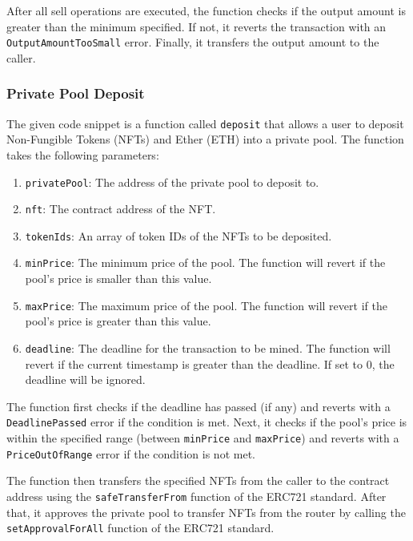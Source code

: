 After all sell operations are executed, the function checks if the
output amount is greater than the minimum specified. If not, it reverts
the transaction with an \texttt{OutputAmountTooSmall} error. Finally, it
transfers the output amount to the caller.

\hypertarget{private-pool-deposit}{%
\subsubsection{Private Pool Deposit}\label{private-pool-deposit}}

The given code snippet is a function called \texttt{deposit} that allows
a user to deposit Non-Fungible Tokens (NFTs) and Ether (ETH) into a
private pool. The function takes the following parameters:

\begin{enumerate}
\def\labelenumi{\arabic{enumi}.}
\tightlist
\item
  \texttt{privatePool}: The address of the private pool to deposit to.
\item
  \texttt{nft}: The contract address of the NFT.
\item
  \texttt{tokenIds}: An array of token IDs of the NFTs to be deposited.
\item
  \texttt{minPrice}: The minimum price of the pool. The function will
  revert if the pool's price is smaller than this value.
\item
  \texttt{maxPrice}: The maximum price of the pool. The function will
  revert if the pool's price is greater than this value.
\item
  \texttt{deadline}: The deadline for the transaction to be mined. The
  function will revert if the current timestamp is greater than the
  deadline. If set to 0, the deadline will be ignored.
\end{enumerate}

The function first checks if the deadline has passed (if any) and
reverts with a \texttt{DeadlinePassed} error if the condition is met.
Next, it checks if the pool's price is within the specified range
(between \texttt{minPrice} and \texttt{maxPrice}) and reverts with a
\texttt{PriceOutOfRange} error if the condition is not met.

The function then transfers the specified NFTs from the caller to the
contract address using the \texttt{safeTransferFrom} function of the
ERC721 standard. After that, it approves the private pool to transfer
NFTs from the router by calling the \texttt{setApprovalForAll} function
of the ERC721 standard.

